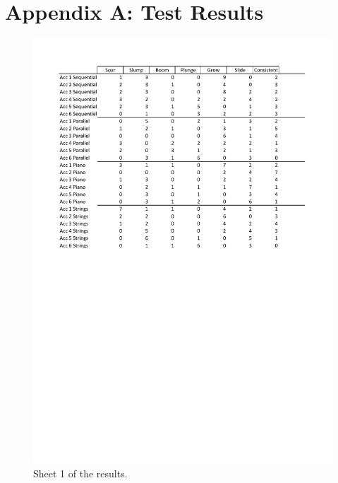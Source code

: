\section{Appendix A: Test Results}

\begin{figure}[ht]
\centering
\includegraphics[scale=0.75]{results1}
\caption{Sheet 1 of the results.}
\label{fig:results}
\end{figure}

